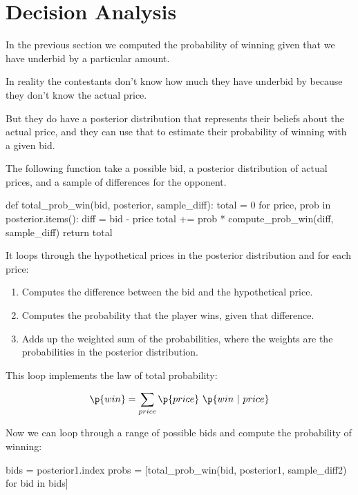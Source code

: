 \documentclass[12pt]{book}
\theoremstyle{exercise}
\begin{document}
\section{Decision Analysis}

In the previous section we computed the probability of winning given that we have underbid by a particular amount.

In reality the contestants don't know how much they have underbid by because they don't know the actual price.

But they do have a posterior distribution that represents their beliefs about the actual price, and they can use that to estimate their probability of winning with a given bid.

The following function take a possible bid, a posterior distribution of actual prices, and a sample of differences for the opponent.

\begin{code}
def total_prob_win(bid, posterior, sample_diff):
    total = 0
    for price, prob in posterior.items():
        diff = bid - price
        total += prob * compute_prob_win(diff, sample_diff)
    return total
\end{code}

It loops through the hypothetical prices in the posterior distribution and for each price:

\begin{enumerate}

\item Computes the difference between the bid and the hypothetical price.

\item Computes the probability that the player wins, given that difference.

\item Adds up the weighted sum of the probabilities, where the weights are the probabilities in the posterior distribution.

\end{enumerate}

This loop implements the law of total probability:

\[ \p{win} = \sum_{price} \p{price} ~ \p{win ~|~ price} \]

Now we can loop through a range of possible bids and compute the probability of winning:

\begin{code}
bids = posterior1.index
probs = [total_prob_win(bid, posterior1, sample_diff2)
         for bid in bids]
\end{code}
\end{document}
